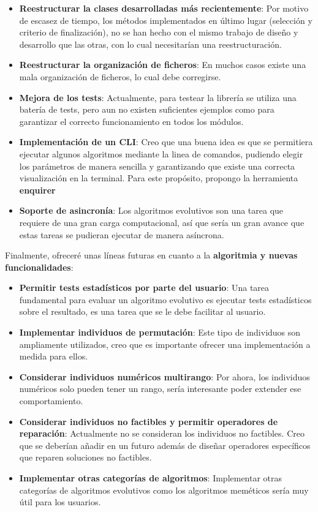 \begin{itemize}
    \item \textbf{Reestructurar la clases desarrolladas más recientemente}: Por motivo de escasez de tiempo, los métodos implementados en último lugar (selección y criterio de finalización), no se han hecho con el mismo trabajo de diseño y desarrollo que las otras, con lo cual necesitarían una reestructuración.
    \item \textbf{Reestructurar la organización de ficheros}: En muchos casos existe una mala organización de ficheros, lo cual debe corregirse.
    \item \textbf{Mejora de los tests}: Actualmente, para testear la librería se utiliza una batería de tests, pero aun no existen suficientes ejemplos como para garantizar el correcto funcionamiento en todos los módulos.
    \item \textbf{Implementación de un CLI}: Creo que una buena idea es que se permitiera ejecutar algunos algoritmos mediante la linea de comandos, pudiendo elegir los parámetros de manera sencilla y garantizando que existe una correcta visualización en la terminal. Para este propósito, propongo la herramienta \textbf{enquirer}
    \item \textbf{Soporte de asincronía}: Los algoritmos evolutivos son una tarea que requiere de una gran carga computacional, así que sería un gran avance que estas tareas se pudieran ejecutar de manera asíncrona.
\end{itemize}

Finalmente, ofreceré unas líneas futuras en cuanto a la \textbf{algoritmia y nuevas funcionalidades}:

\begin{itemize}
    \item \textbf{Permitir tests estadísticos por parte del usuario}: Una tarea fundamental para evaluar un algoritmo evolutivo es ejecutar tests estadísticos sobre el resultado, es una tarea que se le debe facilitar al usuario.
    \item \textbf{Implementar individuos de permutación}: Este tipo de individuos son ampliamente utilizados, creo que es importante ofrecer una implementación a medida para ellos.
    \item \textbf{Considerar individuos numéricos multirango}: Por ahora, los individuos numéricos solo pueden tener un rango, sería interesante poder extender ese comportamiento.
    \item \textbf{Considerar individuos no factibles y permitir operadores de reparación}: Actualmente no se consideran los individuos no factibles. Creo que se deberían añadir en un futuro además de diseñar operadores específicos que reparen soluciones no factibles.
    \item \textbf{Implementar otras categorías de algoritmos}: Implementar otras categorías de algoritmos evolutivos como los algoritmos meméticos sería muy útil para los usuarios.
\end{itemize}
